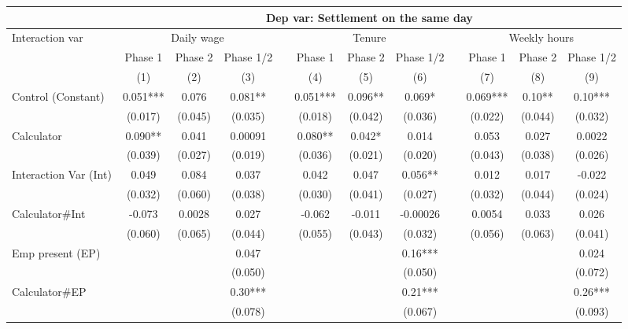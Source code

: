 \begin{tabular}{lccccccccccc}
\toprule
      & \multicolumn{11}{c}{Dep var: Settlement on the same day} \\
\midrule
Interaction var & \multicolumn{3}{c}{Daily wage} &       & \multicolumn{3}{c}{Tenure} &       & \multicolumn{3}{c}{Weekly hours} \\
\cmidrule{2-4}\cmidrule{6-8}\cmidrule{10-12}      & Phase 1 & Phase 2 & Phase 1/2 &       & Phase 1 & Phase 2 & Phase 1/2 &       & Phase 1 & Phase 2 & Phase 1/2 \\
\midrule
\midrule
      & (1)   & (2)   & (3)   &       & (4)   & (5)   & (6)   &       & (7)   & (8)   & (9) \\
\midrule
\midrule
Control (Constant) & 0.051*** & 0.076 & 0.081** &       & 0.051*** & 0.096** & 0.069* &       & 0.069*** & 0.10** & 0.10*** \\
      & (0.017) & (0.045) & (0.035) &       & (0.018) & (0.042) & (0.036) &       & (0.022) & (0.044) & (0.032) \\
Calculator & 0.090** & 0.041 & 0.00091 &       & 0.080** & 0.042* & 0.014 &       & 0.053 & 0.027 & 0.0022 \\
      & (0.039) & (0.027) & (0.019) &       & (0.036) & (0.021) & (0.020) &       & (0.043) & (0.038) & (0.026) \\
Interaction Var (Int) & 0.049 & 0.084 & 0.037 &       & 0.042 & 0.047 & 0.056** &       & 0.012 & 0.017 & -0.022 \\
      & (0.032) & (0.060) & (0.038) &       & (0.030) & (0.041) & (0.027) &       & (0.032) & (0.044) & (0.024) \\
Calculator\#Int & -0.073 & 0.0028 & 0.027 &       & -0.062 & -0.011 & -0.00026 &       & 0.0054 & 0.033 & 0.026 \\
      & (0.060) & (0.065) & (0.044) &       & (0.055) & (0.043) & (0.032) &       & (0.056) & (0.063) & (0.041) \\
Emp present (EP) &       &       & 0.047 &       &       &       & 0.16*** &       &       &       & 0.024 \\
      &       &       & (0.050) &       &       &       & (0.050) &       &       &       & (0.072) \\
Calculator\#EP   &       &       & 0.30*** &       &       &       & 0.21*** &       &       &       & 0.26*** \\
      &       &       & (0.078) &       &       &       & (0.067) &       &       &       & (0.093) \\

\end{tabular}

